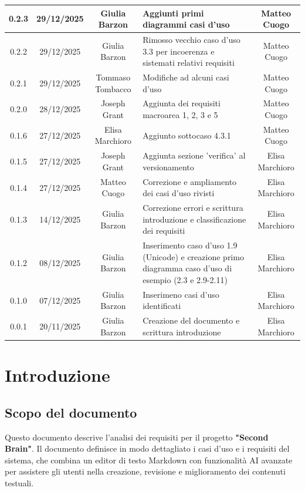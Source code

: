 \documentclass[11pt,a4paper]{article}
\begin{document}
\begin{longtable}[H]{|c|c|c|>{\raggedright\arraybackslash}p{}|c|}
        \hline
        0.2.3 & 29/12/2025 & Giulia Barzon & Aggiunti primi diagrammi casi d'uso &  Matteo Cuogo \\
        \hline
        0.2.2 & 29/12/2025 & Giulia Barzon & Rimosso vecchio caso d'uso 3.3 per incoerenza e sistemati relativi requisiti & Matteo Cuogo \\
        \hline
        0.2.1 & 29/12/2025 & Tommaso Tombacco & Modifiche ad alcuni casi d'uso &  Matteo Cuogo\\ 
        \hline
        0.2.0 & 28/12/2025 & Joseph Grant & Aggiunta dei requisiti macroarea 1, 2, 3 e 5 &  Matteo Cuogo\\ 
        \hline
        0.1.6 & 27/12/2025 & Elisa Marchioro & Aggiunto sottocaso 4.3.1 & Matteo Cuogo\\ 
        \hline
        0.1.5 & 27/12/2025 & Joseph Grant & Aggiunta sezione 'verifica' al versionamento & Elisa Marchioro\\ 
        \hline
        0.1.4 & 27/12/2025 & Matteo Cuogo & Correzione e ampliamento dei casi d'uso rivisti & Elisa Marchioro\\
        \hline
        0.1.3 & 14/12/2025 & Giulia Barzon & Correzione errori e scrittura introduzione e classificazione dei requisiti & Elisa Marchioro\\
        \hline
        0.1.2 & 08/12/2025 & Giulia Barzon & Inserimento caso d'uso 1.9 (Unicode) e creazione primo diagramma caso d'uso di esempio (2.3 e 2.9-2.11) & Elisa Marchioro\\
        \hline
        0.1.0 & 07/12/2025 & Giulia Barzon & Inserimeno casi d'uso identificati & Elisa Marchioro\\
        \hline
        0.0.1 & 20/11/2025 & Giulia Barzon & Creazione del documento e scrittura introduzione & Elisa Marchioro\\
        \hline
\end{longtable}

\newpage

\tableofcontents
\thispagestyle{empty}
\newpage

\setcounter{page}{1}

\section{Introduzione}
\subsection{Scopo del documento}
Questo documento descrive l'analisi dei requisiti per il progetto \textbf{"Second Brain"}. Il documento definisce in modo dettagliato i casi d'uso e i requisiti del sistema, che combina un editor di testo Markdown con funzionalità AI avanzate per assistere gli utenti nella creazione, revisione e miglioramento dei contenuti testuali.
\end{document}
